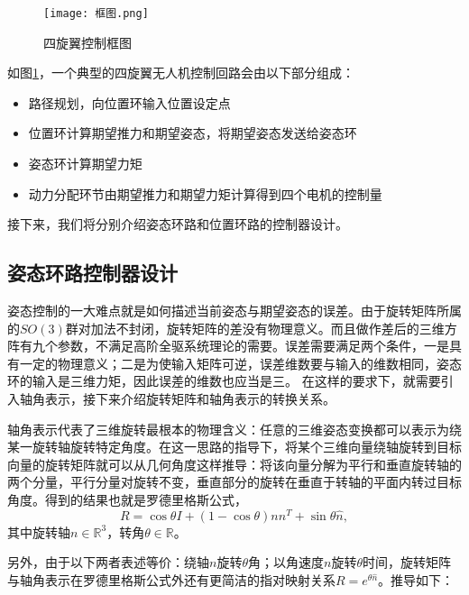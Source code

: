 \begin{figure}[!h]
    \centering
    \texttt{[image: 框图.png]}
    \caption{四旋翼控制框图}
    \label{框图}
  \end{figure}
如图\ref{框图}，一个典型的四旋翼无人机控制回路会由以下部分组成：
\begin{itemize}
     \item 路径规划，向位置环输入位置设定点
     \item 位置环计算期望推力和期望姿态，将期望姿态发送给姿态环
     \item 姿态环计算期望力矩
     \item 动力分配环节由期望推力和期望力矩计算得到四个电机的控制量
   \end{itemize}

   接下来，我们将分别介绍姿态环路和位置环路的控制器设计。
\subsection*{姿态环路控制器设计}
姿态控制的一大难点就是如何描述当前姿态与期望姿态的误差。由于旋转矩阵所属的$SO(3)$群对加法不封闭，旋转矩阵的差没有物理意义。而且做作差后的三维方阵有九个参数，不满足高阶全驱系统理论的需要。误差需要满足两个条件，一是具有一定的物理意义；二是为使输入矩阵可逆，误差维数要与输入的维数相同，姿态环的输入是三维力矩，因此误差的维数也应当是三。
在这样的要求下，就需要引入轴角表示，接下来介绍旋转矩阵和轴角表示的转换关系。

轴角表示代表了三维旋转最根本的物理含义：任意的三维姿态变换都可以表示为绕某一旋转轴旋转特定角度。在这一思路的指导下，将某个三维向量绕轴旋转到目标向量的旋转矩阵就可以从几何角度这样推导：将该向量分解为平行和垂直旋转轴的两个分量，平行分量对旋转不变，垂直部分的旋转在垂直于转轴的平面内转过目标角度。得到的结果也就是罗德里格斯公式\cite{Rodrigues1840}，
\begin{equation}
  R=\cos \theta I+(1- \cos \theta)nn^T+\sin\theta \widehat n,
  \label{equ:Rodrigue}
\end{equation}
其中旋转轴$n \in \mathbb{R}^{3}$，转角$\theta \in \mathbb{R}$。

另外，由于以下两者表述等价：绕轴$n$旋转$\theta$角；以角速度$n$旋转$\theta$时间，旋转矩阵与轴角表示在罗德里格斯公式外还有更简洁的指对映射关系$R=e^{\theta \widehat n}$。推导如下：

